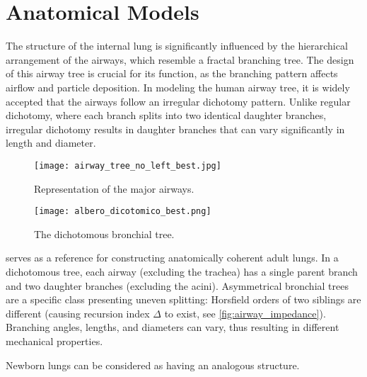 \section{Anatomical Models}
\label{subsec:anatomical_models}

The structure of the internal lung is significantly influenced by the
hierarchical arrangement of the airways, which resemble a fractal
branching tree\cite{suki2011}. The design of this airway tree is
crucial for its function, as the branching pattern affects 
airflow and particle deposition. In modeling the human airway tree, it
is widely accepted that the airways follow an irregular dichotomy
pattern. Unlike regular dichotomy, where each branch splits into two
identical daughter branches, irregular dichotomy results in daughter
branches that can vary significantly in length and diameter.

\vspace{2.25em}

\begin{figure}[H]\centering
  \texttt{[image: airway\_tree\_no\_left\_best.jpg]}
  \caption{Representation of the major airways.}
  \label{fig:airway_tree_anatomical}
\end{figure}

\vspace{2.25em}

\begin{figure}[H]\centering
  \texttt{[image: albero\_dicotomico\_best.png]}
  \caption{The dichotomous bronchial tree.}
  \label{fig:albero_dicotomico_anatomical}
\end{figure}

 serves as a reference for
constructing anatomically coherent adult lungs. In a dichotomous tree,
each airway (excluding the trachea) has a single parent branch and two
daughter branches (excluding the acini).  Asymmetrical bronchial trees
are a specific class presenting uneven splitting: Horsfield orders of
two siblings are different (causing recursion index $\Delta$
to exist, see \cref{fig:airway_impedance}).  Branching angles, lengths, and diameters can vary, thus resulting in different mechanical
properties.

Newborn lungs can be considered as having an analogous structure.


